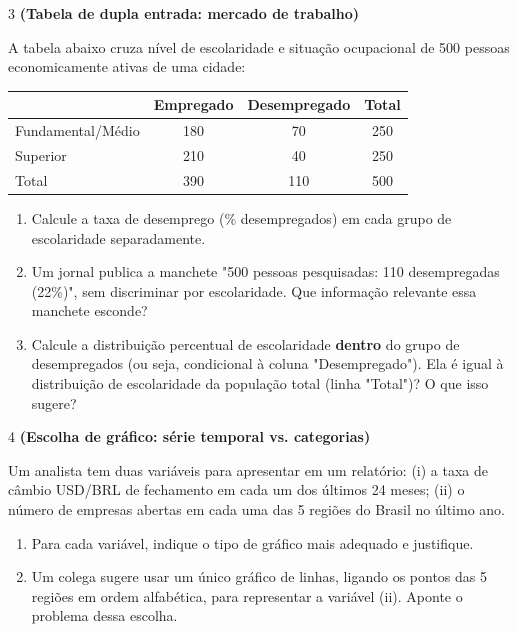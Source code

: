 \documentclass[11pt]{article}
\begin{document}
\begin{questao}{3} \textbf{(Tabela de dupla entrada: mercado de trabalho)}

A tabela abaixo cruza nível de escolaridade e situação ocupacional de 500 pessoas economicamente
ativas de uma cidade:

\begin{center}
\begin{tabular}{l|cc|c}
\toprule
 & Empregado & Desempregado & Total \\
\midrule
Fundamental/Médio & 180 & 70 & 250 \\
Superior          & 210 & 40 & 250 \\
\midrule
Total             & 390 & 110 & 500 \\
\bottomrule
\end{tabular}
\end{center}

\begin{enumerate}[label=(\alph*)]
  \item Calcule a taxa de desemprego (\% desempregados) em cada grupo de escolaridade
    separadamente.
  \item Um jornal publica a manchete "500 pessoas pesquisadas: 110 desempregadas (22\%)", sem
    discriminar por escolaridade. Que informação relevante essa manchete esconde?
  \item Calcule a distribuição percentual de escolaridade \textbf{dentro} do grupo de desempregados (ou
    seja, condicional à coluna "Desempregado"). Ela é igual à distribuição de escolaridade da
    população total (linha "Total")? O que isso sugere?
\end{enumerate}
\end{questao}

\begin{questao}{4} \textbf{(Escolha de gráfico: série temporal vs. categorias)}

Um analista tem duas variáveis para apresentar em um relatório: (i) a taxa de câmbio USD/BRL de
fechamento em cada um dos últimos 24 meses; (ii) o número de empresas abertas em cada uma das 5
regiões do Brasil no último ano.

\begin{enumerate}[label=(\alph*)]
  \item Para cada variável, indique o tipo de gráfico mais adequado e justifique.
  \item Um colega sugere usar um único gráfico de linhas, ligando os pontos das 5 regiões em ordem
    alfabética, para representar a variável (ii). Aponte o problema dessa escolha.
\end{enumerate}
\end{questao}
\end{document}
